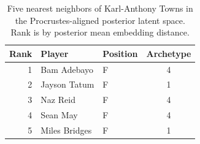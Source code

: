 \begin{table}[htbp]
  \centering\small
  \begin{tabular}{rllc}
    \toprule
    Rank & Player & Position & Archetype \\
    \midrule
    1 & Bam Adebayo & F & 4 \\
    2 & Jayson Tatum & F & 1 \\
    3 & Naz Reid & F & 4 \\
    4 & Sean May & F & 4 \\
    5 & Miles Bridges & F & 1 \\
    \bottomrule
  \end{tabular}
  \caption{Five nearest neighbors of Karl-Anthony Towns in the Procrustes-aligned posterior latent space. Rank is by posterior mean embedding distance.}
  \label{tab:Karl_Anthony_Towns_neighbors}
\end{table}

